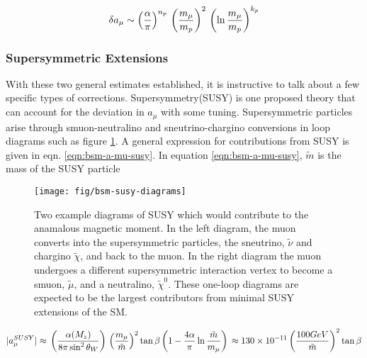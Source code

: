 \begin{equation}
\label{eqn:bsm-general-large-m}
\delta a_\mu \sim \left(\frac{\alpha}{\pi}\right)^{n_p} \\
\left(\frac{m_\mu}{m_p}\right)^2 \\
\left(\ln{\frac{m_\mu}{m_p}} \right)^{k_p}
\end{equation}

\subsubsection{Supersymmetric Extensions}
With these two general estimates established, it is instructive to talk about a few specific types of corrections.  Supersymmetry(SUSY) is one proposed theory that can account for the deviation in $a_\mu$ with some tuning.  Supersymmetric particles arise through smuon-neutralino and sneutrino-chargino conversions in loop diagrams such as figure \ref{fig:bsm-susy-diagrams}.  A general expression for contributions from SUSY is given in eqn. \ref{eqn:bsm-a-mu-susy}\cite{a-mu-harbinger}.  In equation \ref{eqn:bsm-a-mu-susy}, $\tilde{m}$ is the mass of the SUSY particle

\begin{figure}
\label{fig:bsm-susy-diagrams}
\centering
\texttt{[image: fig/bsm-susy-diagrams]}
\caption{Two example diagrams of SUSY which would contribute to the anamalous magnetic moment. In the left diagram, the muon converts into the supersymmetric particles, the sneutrino, $\tilde{\nu}$ and chargino $\tilde{\chi}$, and back to the muon.  In the right diagram the muon undergoes a different supersymmetric interaction vertex to become a smuon, $\tilde{\mu}$, and a neutralino, $\tilde{\chi}^0$.  These one-loop diagrams are expected to be the largest contributors from minimal SUSY extensions of the SM.}
\end{figure}

\begin{equation}
\label{eqn:bsm-a-mu-susy}
|a_\mu^{SUSY}| \approx \\
\left(\frac{\alpha(M_z)}{8 \pi \sin^2{\theta_W}} \right) \\
\left( \frac{m_\mu}{\tilde{m}} \right)^2 \tan{\beta} \\
\left(1 - \frac{4\alpha}{\pi}\ln{\frac{\tilde{m}}{m_\mu}} \right) \\
\approx 130 \times 10^{-11} \\
\left(\frac{100 GeV}{\tilde{m}} \right)^2 \tan{\beta}
\end{equation}

